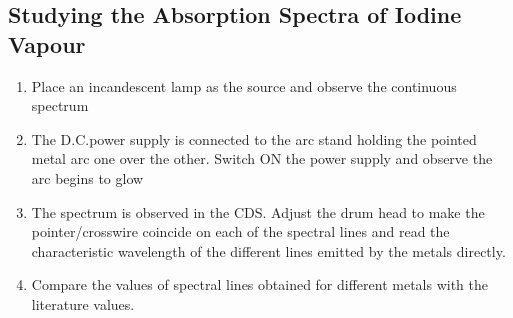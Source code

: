 \subsection*{Studying the Absorption Spectra of Iodine Vapour}

\begin{enumerate}
    \item Place an incandescent lamp
    as the source and observe the continuous spectrum
    \item The D.C.power supply is connected to the arc stand holding the pointed metal arc one
    over the other. Switch ON the power supply and observe the arc begins to glow
    \item The spectrum is observed in the CDS. Adjust the drum head to make the
    pointer/crosswire coincide on each of the spectral lines and read the characteristic
    wavelength of the different lines emitted by the metals directly.
    \item Compare the values of spectral lines obtained for different metals with the literature
    values.
\end{enumerate}